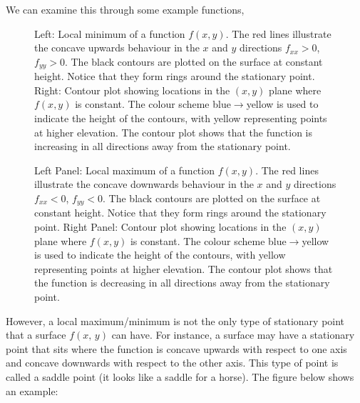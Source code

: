 \documentclass[letterpaper,10pt,english]{jupyterBook}
\begin{document}
\sphinxAtStartPar
We can examine this through some example functions,

\begin{figure}[htbp]
\centering
\capstart

\noindent{}
\caption{Left: Local minimum of a function \(f(x,y)\). The red lines illustrate the concave upwards behaviour in the \(x\) and \(y\) directions \(f_{xx}>0\), \(f_{yy}>0\).
The black contours are plotted on the surface at constant height. Notice that they form rings around the stationary point.
Right: Contour plot showing locations in the \((x,y)\) plane where \(f(x,y)\) is constant.
The colour scheme blue\(\rightarrow\)yellow is used to indicate the height of the contours, with yellow representing points at higher elevation.
The contour plot shows that the function is increasing in all directions away from the stationary point.}\label{\detokenize{VectorCalculus/partialdifferentiation:bowl1}}\end{figure}

\begin{figure}[htbp]
\centering
\capstart

\noindent{}
\caption{Left Panel: Local maximum of a function \(f(x,y)\). The red lines illustrate the concave downwards behaviour in the \(x\) and \(y\) directions \(f_{xx}<0\), \(f_{yy}<0\).
The black contours are plotted on the surface at constant height. Notice that they form rings around the stationary point.
Right Panel: Contour plot showing locations in the \((x,y)\) plane where \(f(x,y)\) is constant. The colour scheme blue\(\rightarrow\)yellow is used to indicate
the height of the contours, with yellow representing points at higher elevation. The contour plot shows that the function is decreasing in all directions away
from the stationary point.}\label{\detokenize{VectorCalculus/partialdifferentiation:hill1}}\end{figure}

\sphinxAtStartPar
However, a local maximum/minimum is not the only type of stationary point that a surface \(f(x,\,y)\) can have. For instance, a surface may have a stationary
point that sits where the function is concave upwards with respect to one axis and concave downwards with respect to the other axis. This type of point is called
a saddle point (it looks like a saddle for a horse). The figure below shows an example:
\end{document}
